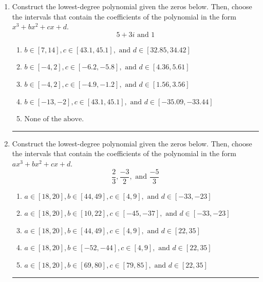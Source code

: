 \documentclass[14pt]{extbook}
\newcommand{\litem}[1]{\item#1\hspace*{-1cm}\rule{\textwidth}{0.4pt}}
\begin{document}
\begin{enumerate}
{\begin{enumerate}[label=\Alph*.]
\end{enumerate} }
\litem{
Construct the lowest-degree polynomial given the zeros below. Then, choose the intervals that contain the coefficients of the polynomial in the form $x^3+bx^2+cx+d$.\[ 5 + 3 i \text{ and } 1 \]\begin{enumerate}[label=\Alph*.]
\item \( b \in [7, 14], c \in [43.1, 45.1], \text{ and } d \in [32.85, 34.42] \)
\item \( b \in [-4, 2], c \in [-6.2, -5.8], \text{ and } d \in [4.36, 5.61] \)
\item \( b \in [-4, 2], c \in [-4.9, -1.2], \text{ and } d \in [1.56, 3.56] \)
\item \( b \in [-13, -2], c \in [43.1, 45.1], \text{ and } d \in [-35.09, -33.44] \)
\item \( \text{None of the above.} \)

\end{enumerate} }
\litem{
Construct the lowest-degree polynomial given the zeros below. Then, choose the intervals that contain the coefficients of the polynomial in the form $ax^3+bx^2+cx+d$.\[ \frac{2}{3}, \frac{-3}{2}, \text{ and } \frac{-5}{3} \]\begin{enumerate}[label=\Alph*.]
\item \( a \in [18, 20], b \in [44, 49], c \in [4, 9], \text{ and } d \in [-33, -23] \)
\item \( a \in [18, 20], b \in [10, 22], c \in [-45, -37], \text{ and } d \in [-33, -23] \)
\item \( a \in [18, 20], b \in [44, 49], c \in [4, 9], \text{ and } d \in [22, 35] \)
\item \( a \in [18, 20], b \in [-52, -44], c \in [4, 9], \text{ and } d \in [22, 35] \)
\item \( a \in [18, 20], b \in [69, 80], c \in [79, 85], \text{ and } d \in [22, 35] \)


\end{enumerate}}
\end{enumerate}
\end{document}

